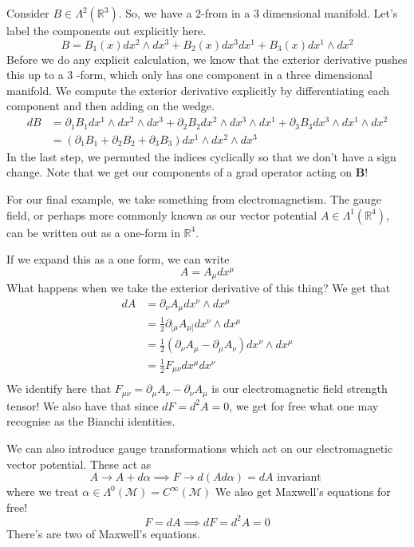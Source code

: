Consider  $ B \in \Lambda^ 2 ( \mathbb{ R} ^ 3 ) $. So, we have
a 2-from in a 3 dimensional manifold. Let's label the components out 
explicitly here. 
\[
 B = B_1 ( x) dx^ 2 \wedge  dx^ 3 + B_2 ( x) dx^ 3 dx^ 1 + B_3 ( x) dx^ 1 \wedge  dx^ 2 
\] Before we do any explicit calculation, 
we know that the exterior derivative pushes this up to a 3 -form, which only has one component
in a three dimensional manifold. We compute the exterior derivative 
explicitly by differentiating each component
and then adding on the wedge.
\begin{align*}
	d B &=  \partial _ 1 B_ 1 dx ^1 \wedge  dx ^ 2 \wedge  dx^ 3  + \partial _ 2 B_2 dx^ 2 \wedge  dx^ 3 \wedge  dx^ 1 + \partial  _ 3 B _ 3 dx^ 3 \wedge  dx^ 1 \wedge  dx^ 2  \\
	    &=   \left( \partial  _ 1 B _ 1 + \partial  _ 2 B _ 2 + \partial  _ 3 B _ 3 
	     \right) dx^ 1 \wedge  dx^ 2 \wedge  dx^ 3 
\end{align*} 
In the last step, we permuted the indices cyclically 
so that we don't have a sign change. 
Note that we get our components of a grad
operator acting on $ \mathbf { B } $! 

For our final example, we take something from
electromagnetism. The gauge field, or perhaps more commonly 
known as our vector potential $ A \in \Lambda ^ 1 ( \mathbb{ R} ^ 4 ) $, 
can be written out as a one-form in $ \mathbb{ R } ^ 4 $. 

If we expand this as a one form, we can write 
\[
 A = A_ \mu dx^ \mu 
\] 
What happens when we take the exterior 
derivative of this thing? 
We get that 
\begin{align*}
	dA &= \partial  _ \nu A _ \mu dx^ \nu \wedge  dx ^ \mu   \\
	   &=  \frac{1}{2 } \partial _{ [ \mu } A _{ \mu ] } dx^ \nu \wedge  dx ^ \mu \\ 
	   &=  \frac{1}{2 } \left(  \partial  _ \nu A _ \mu - \partial  _ \mu 
	   A _ \nu  \right) dx^ \nu \wedge dx ^ \mu \\
	   &=  \frac{1}{2 } F_{ \mu  \nu  } dx^ \mu  dx ^ \nu  \\
\end{align*} 
We identify here that $ F_{ \mu \nu} = \partial  _ \mu A _ \nu - \partial  _ \nu A _ \mu $ 
is our electromagnetic field strength tensor! 
We also have that since $ d F = d ^2 A = 0 $, 
we get for free what one may recognise as the Bianchi 
identities. 

We can also introduce gauge transformations
which act on our electromagnetic 
vector potential. These act as 
\[
A\to A+ d\alpha  \implies F \to d ( A d\alpha ) = dA \text{ invariant } 
\] where we treat $ \alpha \in \Lambda^ 0 ( \mathcal{ M } ) = C^\infty ( \mathcal{ M }) $
We also get Maxwell's equations for free! 
\[
F = dA \implies dF = d^ 2 A = 0
\] There's are two of Maxwell's equations. 

